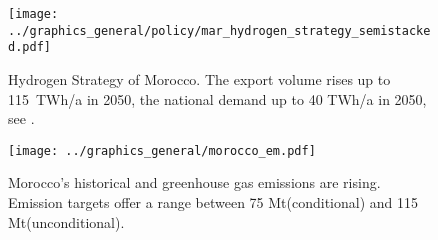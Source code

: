 \begin{figure}
    \centering
    \texttt{[image: ../graphics\_general/policy/mar\_hydrogen\_strategy\_semistacked.pdf]}
    \caption{Hydrogen Strategy of Morocco. The export volume rises up to 115~TWh/a in 2050, the national demand up to 40 TWh/a in 2050, see \cite{MarHyStrat2021}.}
    \label{fig:mar_hydrogen_strategy}
\end{figure}


\begin{figure}[h!]
    \centering
    \texttt{[image: ../graphics\_general/morocco\_em.pdf]}
    \caption{Morocco's historical \co and greenhouse gas emissions are rising. Emission targets offer a range between 75 Mt\coe (conditional) and 115 Mt\coe (unconditional).}
    \label{fig:morocco_em}
\end{figure}
